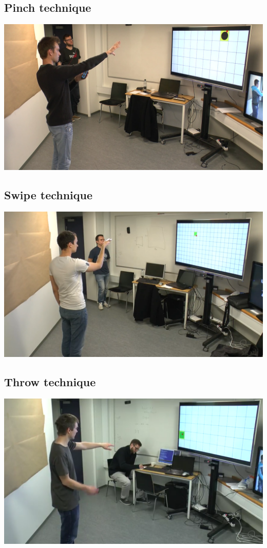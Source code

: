 \subsection*{Pinch technique}
\includegraphics[width=\textwidth]{appendix/images/steffen_pinch.png}

\subsection*{Swipe technique}
\includegraphics[width=\textwidth]{appendix/images/mathias_swipe.png}

\subsection*{Throw technique}
\includegraphics[width=\textwidth]{appendix/images/christian_throwing.png}

